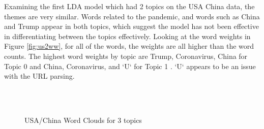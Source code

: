 Examining the first LDA model which had 2 topics on the USA China data, the themes are very similar. Words related to the pandemic, and words such as China and Trump appear in both topics, which suggest the model has not been effective in differentiating between the topics effectively. Looking at the word weights in Figure \ref{fig:us2ww}, for all of the words, the weights are all higher than the word counts. The highest word weights by topic are Trump, Coronavirus, China for Topic 0 and China, Coronavirus, and `U` for Topic 1 . `U` appears to be an issue with the URL parsing.  
\begin{figure}[H]
	\centering
	\\
	\\
	
	\caption{USA/China Word Clouds for 3 topics}
	\label{fig:usa3}
\end{figure}

